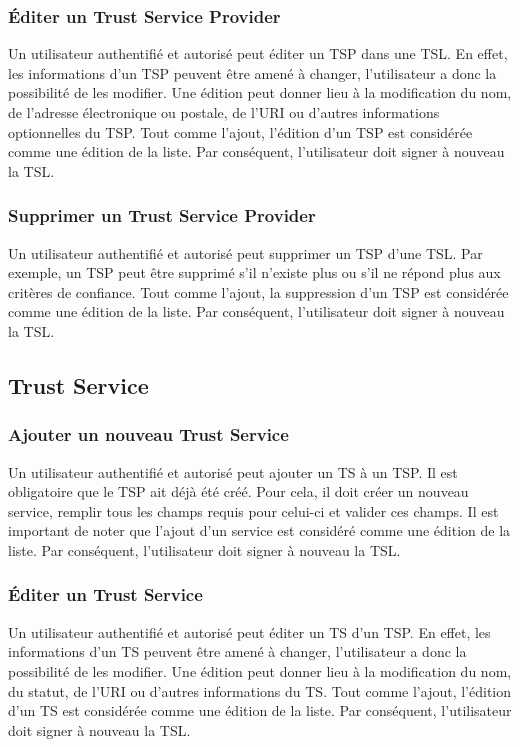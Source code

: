 \documentclass{tnreport}
\begin{document}
\subsubsection{Éditer un Trust Service Provider}
Un utilisateur authentifié et autorisé peut éditer un TSP dans une TSL. En effet, les informations d'un TSP peuvent être amené à changer, l'utilisateur a donc la possibilité de les modifier. Une édition peut donner lieu à la modification du nom, de l'adresse électronique ou postale, de l'URI ou d'autres informations optionnelles du TSP. Tout comme l'ajout, l'édition d'un TSP est considérée comme une édition de la liste. Par conséquent, l'utilisateur doit signer à nouveau la TSL.
\subsubsection{Supprimer un Trust Service Provider}
Un utilisateur authentifié et autorisé peut supprimer un TSP d'une TSL. Par exemple, un TSP peut être supprimé s'il n'existe plus ou s'il ne répond plus aux critères de confiance. Tout comme l'ajout, la suppression d'un TSP est considérée comme une édition de la liste. Par conséquent, l'utilisateur doit signer à nouveau la TSL.

\subsection{Trust Service}
\subsubsection{Ajouter un nouveau Trust Service}
Un utilisateur authentifié et autorisé peut ajouter un TS à un TSP. Il est obligatoire que le TSP ait déjà été créé. Pour cela, il doit créer un nouveau service, remplir tous les champs requis pour celui-ci et valider ces champs. Il est important de noter que l'ajout d'un service est considéré comme une édition de la liste. Par conséquent, l'utilisateur doit signer à nouveau la TSL.
\subsubsection{Éditer un Trust Service}
Un utilisateur authentifié et autorisé peut éditer un TS d'un TSP. En effet, les informations d'un TS peuvent être amené à changer, l'utilisateur a donc la possibilité de les modifier. Une édition peut donner lieu à la modification du nom, du statut, de l'URI ou d'autres informations du TS. Tout comme l'ajout, l'édition d'un TS est considérée comme une édition de la liste. Par conséquent, l'utilisateur doit signer à nouveau la TSL.
\end{document}
